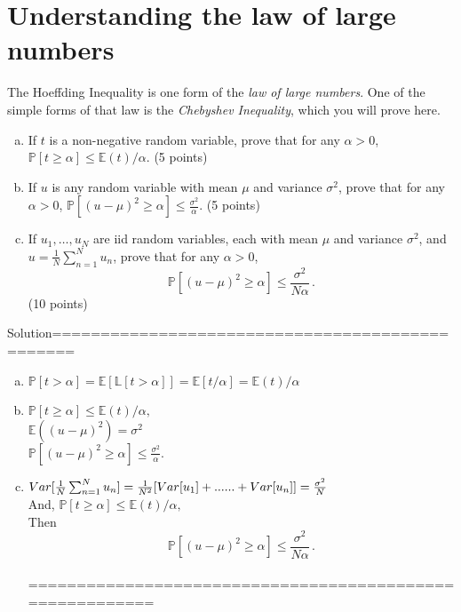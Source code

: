 \documentclass[11pt, a4paper]{article}
\begin{document}
\section{Understanding the law of large numbers}
The Hoeffding Inequality is one form of the \textit{law of large numbers}. One of the simple forms of that law is the \textit{Chebyshev Inequality}, which you will prove here.
\begin{enumerate}[(a)]
	\item If $t$ is a non-negative random variable, prove that for any $\alpha>0$, $\mathbb{P}[t\ge \alpha]\le \mathbb{E}(t)/\alpha.$ (5 points)
	\item If $u$ is any random variable with mean $\mu$ and variance $\sigma^2$, prove that for any $\alpha>0$, $\mathbb{P}[(u-\mu)^2\ge \alpha]\le \frac{\sigma^2}{\alpha}.$ (5 points)
	\item If $u_1,\ldots,u_N$ are iid random variables, each with mean $\mu$ and variance $\sigma^2$, and $u=\frac{1}{N}\sum_{n=1}^N u_n$, prove that for any $\alpha >0 $,
	\[
	\mathbb{P}[(u-\mu)^2\ge \alpha ]\le \frac{\sigma^2}{N\alpha}\,.
	\]
(10 points)
\end{enumerate}


Solution================================================
\begin{enumerate}[(a)]
	\item 
	$\mathbb{P}[t> \alpha] =\mathbb{E}[\mathbb{L}[t> \alpha]]
	=\mathbb{E}[t / \alpha] 
	=\mathbb{E}(t)/ \alpha $
	
	\item $\mathbb{P}[t\ge \alpha]\le \mathbb{E}(t)/\alpha,$\\
		  $ \mathbb{E}((u-\mu)^2)= \sigma^{2}$\\
		  $\mathbb{P}[(u-\mu)^2\ge \alpha]\le \frac{\sigma^2}{\alpha}.$

		  
	
	\item $Var[\frac{1}{N}\sum_{n=1}^N u_n]=\frac{1}{N^{2}} [Var[u_1] +......+Var[u_n]]\\
	    =\frac{\sigma^2}{N}$\\
		And, $\mathbb{P}[t\ge \alpha]\le \mathbb{E}(t)/\alpha,$\\
		Then \\
		\[
	    \mathbb{P}[(u-\mu)^2\ge \alpha ]\le \frac{\sigma^2}{N\alpha}\,.
		\]\\
		=========================================================
	\end{enumerate}
\end{document}
